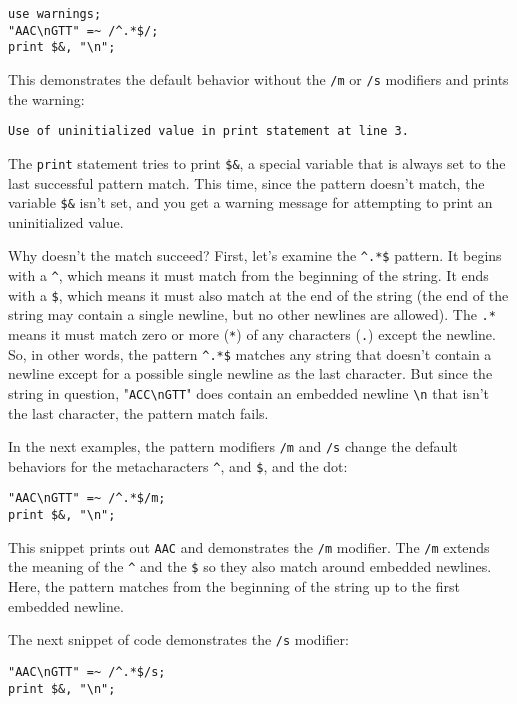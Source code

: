 \begin{lstlisting}
use warnings;
"AAC\nGTT" =~ /^.*$/;
print $&, "\n";
\end{lstlisting}

This demonstrates the default behavior without the \verb|/m| or \verb|/s| modifiers and prints the warning:

\begin{lstlisting}
Use of uninitialized value in print statement at line 3.
\end{lstlisting}

The \verb|print| statement tries to print \verb|$&|, a special variable that is always set to the last successful pattern match. This time, since the pattern doesn't match, the variable \verb|$&| isn't set, and you get a warning message for attempting to print an uninitialized value. 

Why doesn't the match succeed? First, let's examine the \verb|^.*$| pattern. It begins with a \verb|^|, which means it must match from the beginning of the string. It ends with a \verb|$|, which means it must also match at the end of the string (the end of the string may contain a single newline, but no other newlines are allowed). The \verb|.*| means it must match zero or more (\verb|*|) of any characters (\verb|.|) except the newline. So, in other words, the pattern \verb|^.*$| matches any string that doesn't contain a newline except for a possible single newline as the last character. But since the string in question, "\verb|ACC\nGTT|" does contain an embedded newline \verb|\n| that isn't the last character, the pattern match fails.

In the next examples, the pattern modifiers \verb|/m| and \verb|/s| change the default
behaviors for the metacharacters \verb|^|, and \verb|$|, and the dot: 

\begin{lstlisting}
"AAC\nGTT" =~ /^.*$/m;
print $&, "\n";
\end{lstlisting}

This snippet prints out \verb|AAC| and demonstrates the \verb|/m| modifier. The \verb|/m| extends the meaning of the \verb|^| and the \verb|$| so they also match around embedded newlines. Here, the pattern matches from the beginning of the string up to the first embedded newline.

The next snippet of code demonstrates the \verb|/s| modifier: 

\begin{lstlisting}
"AAC\nGTT" =~ /^.*$/s;
print $&, "\n";
\end{lstlisting}

